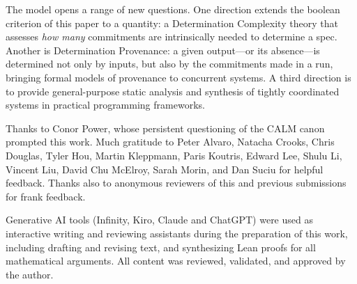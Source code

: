 \documentclass[sigconf]{cidr-2027}
\theoremstyle{remark}
\newcommand{\commitments}{commitments\xspace}
\begin{document}
The model opens a range of new questions.
One direction
extends the boolean criterion of this paper to a quantity: a Determination
Complexity theory that assesses \emph{how many} \commitments are intrinsically
needed to determine a spec. Another is Determination Provenance: a
given output---or its absence---is determined not only by inputs, but also by
the \commitments made in a run, bringing formal models of provenance to
concurrent systems. A third direction is to provide general-purpose static
analysis and synthesis of tightly coordinated systems in practical programming frameworks.

\begin{acks}
Thanks to Conor Power, whose persistent questioning of the CALM canon prompted this work.
Much gratitude to Peter Alvaro, Natacha Crooks, Chris Douglas, Tyler Hou, Martin
Kleppmann, Paris Koutris, Edward Lee, Shulu Li, Vincent Liu, David Chu McElroy,
Sarah Morin, and Dan Suciu for helpful feedback. Thanks also to
anonymous reviewers of this and previous submissions for frank feedback.

Generative AI tools (Infinity, Kiro, Claude and ChatGPT) were used as interactive writing and
reviewing assistants during the preparation of this work, including drafting
and revising text, and synthesizing Lean proofs for all mathematical arguments.  All
content was reviewed, validated, and approved by the author.
\end{acks}



\end{document}
